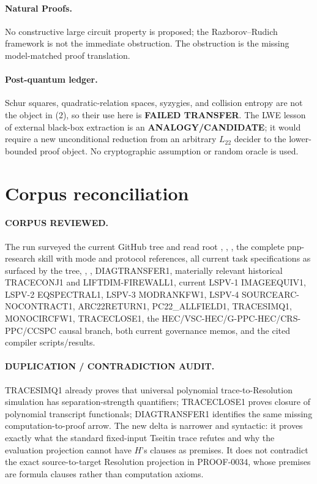 \documentclass[11pt]{article}
\newcommand{\Ltwo}{L_{22}}
\begin{document}
\paragraph{Natural Proofs.}
No constructive large circuit property is proposed; the Razborov--Rudich
framework is not the immediate obstruction.  The obstruction is the missing
model-matched proof translation.

\paragraph{Post-quantum ledger.}
Schur squares, quadratic-relation spaces, syzygies, and collision entropy are
not the object in (2), so their use here is \textbf{FAILED TRANSFER}.  The
LWE lesson of external black-box extraction is an
\textbf{ANALOGY/CANDIDATE}; it would require a new unconditional reduction
from an arbitrary \(\Ltwo\) decider to the lower-bounded proof object.  No
cryptographic assumption or random oracle is used.

\section{Corpus reconciliation}
\paragraph{CORPUS REVIEWED.}
The run surveyed the current GitHub tree and read root ,
, , the complete pnp-research skill with mode
and protocol references, all current task specifications as surfaced by the
tree, , , DIAGTRANSFER1, materially relevant
historical TRACECONJ1 and LIFTDIM-FIREWALL1, current LSPV-1 IMAGEEQUIV1,
LSPV-2 EQSPECTRAL1, LSPV-3 MODRANKFW1, LSPV-4 SOURCEARC-NOCONTRACT1,
ARC22RETURN1, PC22\_ALLFIELD1, TRACESIMQ1, MONOCIRCFW1, TRACECLOSE1, the
HEC/VSC-HEC/G-PPC-HEC/CRS-PPC/CCSPC causal branch, both current governance
memos, and the cited compiler scripts/results.

\paragraph{DUPLICATION / CONTRADICTION AUDIT.}
TRACESIMQ1 already proves that universal polynomial trace-to-Resolution
simulation has separation-strength quantifiers; TRACECLOSE1 proves closure of
polynomial transcript functionals; DIAGTRANSFER1 identifies the same missing
computation-to-proof arrow.  The new delta is narrower and syntactic: it
proves exactly what the standard fixed-input Tseitin trace refutes and why the
evaluation projection cannot have \(H\)'s clauses as premises.  It does not
contradict the exact source-to-target Resolution projection in PROOF-0034,
whose premises are formula clauses rather than computation axioms.
\end{document}

